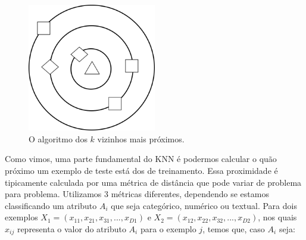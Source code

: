 \begin{figure}[ht!]
\centering
\includegraphics[width=0.5\textwidth]{figures/knn.png}
\caption{O algoritmo dos $k$ vizinhos mais próximos.}
\label{fig::knn}
\end{figure}

Como vimos, uma parte fundamental do \textsc{KNN} é podermos calcular o quão próximo um exemplo de teste está dos de treinamento. 
Essa proximidade é tipicamente calculada por uma métrica de distância que pode variar de problema para problema. Utilizamos 3 métricas diferentes, dependendo se estamos classificando um atributo $A_i$ que seja categórico, numérico ou textual. Para dois exemplos $X_1 =  (x_{11}, x_{21}, x_{31}, ..., x_{D1})$ e $X_2 = (x_{12}, x_{22}, x_{32}, ..., x_{D2})$, nos quais $x_{ij}$ representa o valor do atributo $A_i$ para o exemplo $j$, temos que, caso $A_i$ seja:

